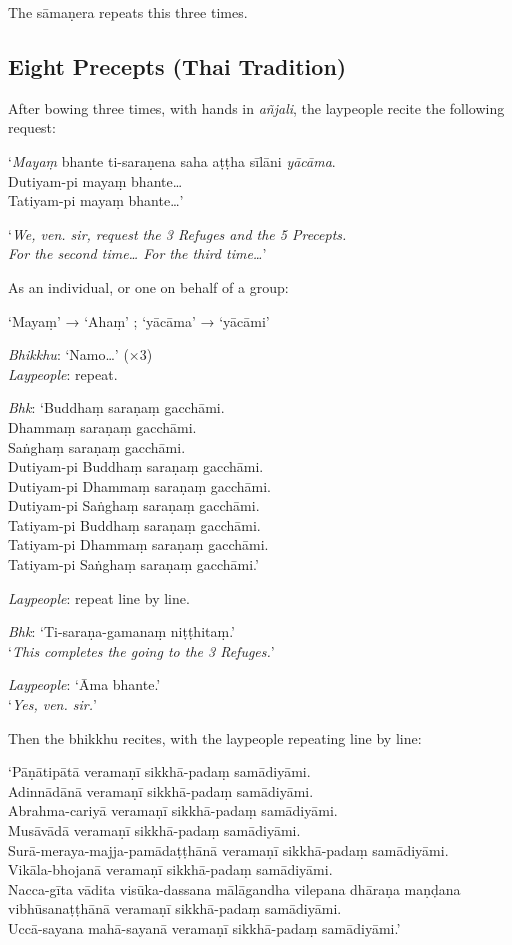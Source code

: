 The sāmaṇera repeats this three times.


\subsection{Eight Precepts (Thai Tradition)}

After bowing three times, with hands in \emph{añjali}, the laypeople recite the
following request:

‘\emph{Mayaṃ} bhante ti-saraṇena saha aṭṭha sīlāni \emph{yācāma}.\\
Dutiyam-pi mayaṃ bhante…\\
Tatiyam-pi mayaṃ bhante…’

‘\emph{We, ven. sir, request the 3 Refuges and the 5 Precepts.\\
  For the second time… For the third time…}’

As an individual, or one on behalf of a group:

‘Mayaṃ’ → ‘Ahaṃ’ ; ‘yācāma’ → ‘yācāmi’

\emph{Bhikkhu}: ‘Namo…’ (×3)\\
\emph{Laypeople}: repeat.

\emph{Bhk}: ‘Buddhaṃ saraṇaṃ gacchāmi.\\
Dhammaṃ saraṇaṃ gacchāmi.\\
Saṅghaṃ saraṇaṃ gacchāmi.\\
Dutiyam-pi Buddhaṃ saraṇaṃ gacchāmi.\\
Dutiyam-pi Dhammaṃ saraṇaṃ gacchāmi.\\
Dutiyam-pi Saṅghaṃ saraṇaṃ gacchāmi.\\
Tatiyam-pi Buddhaṃ saraṇaṃ gacchāmi.\\
Tatiyam-pi Dhammaṃ saraṇaṃ gacchāmi.\\
Tatiyam-pi Saṅghaṃ saraṇaṃ gacchāmi.’

\emph{Laypeople}: repeat line by line.

\emph{Bhk}: ‘Ti-saraṇa-gamanaṃ niṭṭhitaṃ.’\\
‘\emph{This completes the going to the 3 Refuges.}’

\emph{Laypeople}: ‘Āma bhante.’\\
‘\emph{Yes, ven. sir.}’

Then the bhikkhu recites, with the laypeople repeating line by line:

‘Pāṇātipātā veramaṇī sikkhā-padaṃ samādiyāmi.\\
Adinnādānā veramaṇī sikkhā-padaṃ samādiyāmi.\\
Abrahma-cariyā veramaṇī sikkhā-padaṃ samādiyāmi.\\
Musāvādā veramaṇī sikkhā-padaṃ samādiyāmi.\\
Surā-meraya-majja-pamādaṭṭhānā veramaṇī sikkhā-padaṃ samādiyāmi.\\
Vikāla-bhojanā veramaṇī sikkhā-padaṃ samādiyāmi.\\
Nacca-gīta vādita visūka-dassana mālāgandha vilepana dhāraṇa maṇḍana
vibhūsanaṭṭhānā veramaṇī sikkhā-padaṃ samādiyāmi.\\
Uccā-sayana mahā-sayanā veramaṇī sikkhā-padaṃ samādiyāmi.’

